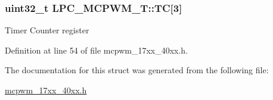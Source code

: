 \subsubsection[{\texorpdfstring{TC}{TC}}]{ uint32\+\_\+t L\+P\+C\+\_\+\+M\+C\+P\+W\+M\+\_\+\+T\+::\+TC\mbox{[}3\mbox{]}}\hypertarget{structLPC__MCPWM__T_ae6960477ec37aa32fbb20956cf01edb7}{}\label{structLPC__MCPWM__T_ae6960477ec37aa32fbb20956cf01edb7}
Timer Counter register 

Definition at line 54 of file mcpwm\+\_\+17xx\+\_\+40xx.\+h.



The documentation for this struct was generated from the following file\+:\begin{DoxyCompactItemize}
\item 
\hyperlink{mcpwm__17xx__40xx_8h}{mcpwm\+\_\+17xx\+\_\+40xx.\+h}\end{DoxyCompactItemize}
